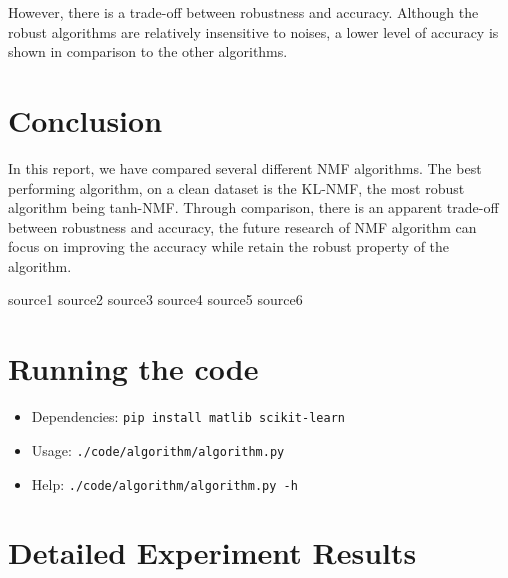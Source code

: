 \documentclass{article} %
\begin{document}
However, there is a trade-off between robustness and accuracy. Although the robust algorithms are relatively insensitive to noises, a lower level of accuracy is shown in comparison to the other algorithms.

\section{Conclusion}
In this report, we have compared several different NMF algorithms. The best performing algorithm, on a clean dataset is the KL-NMF, the most robust algorithm being tanh-NMF. Through comparison, there is an apparent trade-off between robustness and accuracy, the future research of NMF algorithm can focus on improving the accuracy while retain the robust property of the algorithm.


\begin{thebibliography}{9}
 source1
 source2
 source3
 source4
 source5
 source6
\end{thebibliography}

\appendix

\section{Running the code}
\begin{itemize}
\item Dependencies: \texttt{pip install matlib scikit-learn}
\item Usage: \texttt{./code/algorithm/algorithm.py}
\item Help: \texttt{./code/algorithm/algorithm.py -h}
\end{itemize}

\section{Detailed Experiment Results}
\end{document}
